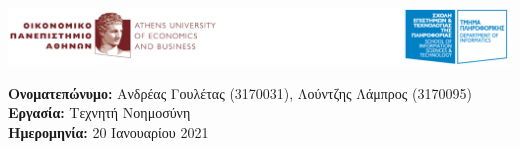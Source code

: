 \begin{titlepage}
    \vspace*{-0.6in}
    \begin{flushleft}
        \includegraphics[scale=0.44]{images/logo.png}
        
        \vspace{1cm}
        \textbf{Ονοματεπώνυμο:} Ανδρέας Γουλέτας (3170031), Λούντζης Λάμπρος (3170095)\\ 
        \textbf{Εργασία:} Τεχνητή Νοημοσύνη\\
        \textbf{Ημερομηνία:} 20 Ιανουαρίου 2021
        
    \end{flushleft}
    \vspace{0.2in}
\end{titlepage}